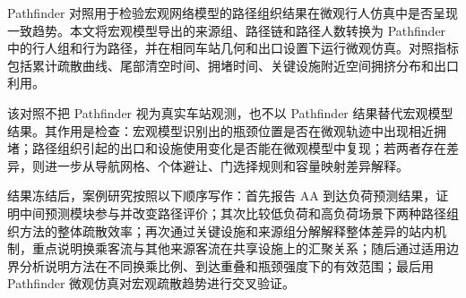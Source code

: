 \documentclass[UTF8,a4paper,12pt]{ctexart}
\begin{document}
Pathfinder 对照用于检验宏观网络模型的路径组织结果在微观行人仿真中是否呈现一致趋势。本文将宏观模型导出的来源组、路径链和路径人数转换为 Pathfinder 中的行人组和行为路径，并在相同车站几何和出口设置下运行微观仿真。对照指标包括累计疏散曲线、尾部清空时间、拥堵时间、关键设施附近空间拥挤分布和出口利用。

该对照不把 Pathfinder 视为真实车站观测，也不以 Pathfinder 结果替代宏观模型结果。其作用是检查：宏观模型识别出的瓶颈位置是否在微观轨迹中出现相近拥堵；路径组织引起的出口和设施使用变化是否能在微观模型中复现；若两者存在差异，则进一步从导航网格、个体避让、门选择规则和容量映射差异解释。

结果冻结后，案例研究按照以下顺序写作：首先报告 AA 到达负荷预测结果，证明中间预测模块参与并改变路径评价；其次比较低负荷和高负荷场景下两种路径组织方法的整体疏散效率；再次通过关键设施和来源组分解解释整体差异的站内机制，重点说明换乘客流与其他来源客流在共享设施上的汇聚关系；随后通过适用边界分析说明方法在不同换乘比例、到达重叠和瓶颈强度下的有效范围；最后用 Pathfinder 微观仿真对宏观疏散趋势进行交叉验证。
\end{document}
